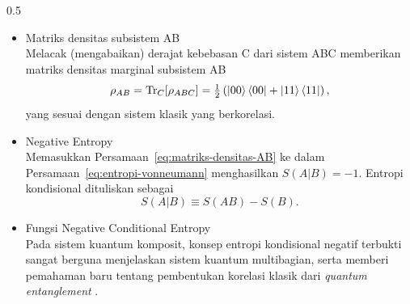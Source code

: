 \begin{frame}
\begin{columns}[T]
        \begin{column}{0.5\textwidth}
            \begin{itemize}\tiny\justifying
                \item Matriks densitas subsistem AB \\
                    Melacak (mengabaikan) derajat kebebasan C dari sistem
                    ABC memberikan matriks densitas marginal subsistem AB
                    \begin{equation}
                        \rho_{AB}=\operatorname{Tr}_C[\rho_{ABC}]
                        =\tfrac{1}{2}\left(\ket{00}\bra{00}+\ket{11}\bra{11}\right),
                        \label{eq:matriks-densitas-AB}
                    \end{equation}
                    yang sesuai dengan sistem klasik yang berkorelasi.
                \item Negative Entropy \\
                    Memasukkan Persamaan~\ref{eq:matriks-densitas-AB} ke dalam
                    Persamaan~\ref{eq:entropi-vonneumann} menghasilkan
                    $S(A|B)=-1$. Entropi kondisional dituliskan sebagai
                    \begin{equation}
                        S(A|B)\equiv S(AB)-S(B).
                    \end{equation}
                \item Fungsi Negative Conditional Entropy \\
                    Pada sistem kuantum komposit, konsep entropi kondisional
                    negatif terbukti sangat berguna menjelaskan sistem kuantum
                    multibagian, serta memberi pemahaman baru tentang pembentukan
                    korelasi klasik dari \textit{quantum entanglement}
                    \cite{cerf1997negative}.
            \end{itemize}
        \end{column}
    \end{columns}
\end{frame}


